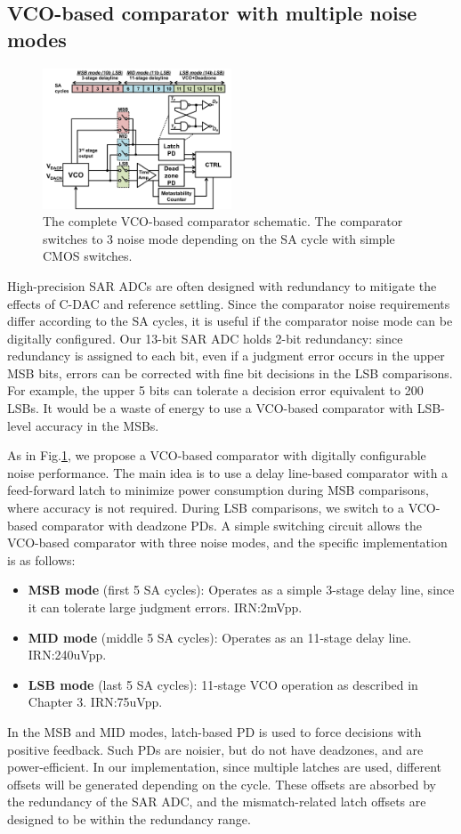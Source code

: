 \documentclass[journal]{IEEEtran}
\begin{document}
\subsection{VCO-based comparator with multiple noise modes}
\begin{figure}[!]
\centering
\includegraphics[width=0.5\textwidth]{figs/vco-entire.png}
\caption{The complete VCO-based comparator schematic. The comparator switches to 3 noise mode depending on the SA cycle with simple CMOS switches.}
\label{fullvco}
\end{figure}

High-precision SAR ADCs are often designed with redundancy to mitigate the effects of C-DAC and reference settling. Since the comparator noise requirements differ according to the SA cycles, it is useful if the comparator noise mode can be digitally configured.
Our 13-bit SAR ADC holds 2-bit redundancy: since redundancy is assigned to each bit, even if a judgment error occurs in the upper MSB bits, errors can be corrected with fine bit decisions in the LSB comparisons\cite{kapusta201314b}. For example, the upper 5 bits can tolerate a decision error equivalent to 200 LSBs. It would be a waste of energy to use a VCO-based comparator with LSB-level accuracy in the MSBs.

As in Fig.\ref{fullvco}, we propose a VCO-based comparator with digitally configurable noise performance. 
The main idea is to use a delay line-based comparator with a feed-forward latch to minimize power consumption during MSB comparisons, where accuracy is not required. During LSB comparisons, we switch to a VCO-based comparator with deadzone PDs. A simple switching circuit allows the VCO-based comparator with three noise modes, and the specific implementation is as follows:
\begin{itemize}
\item \textbf{MSB mode} (first 5 SA cycles): Operates as a simple 3-stage delay line, since it can tolerate large judgment errors. IRN:2mVpp.
\item \textbf{MID mode} (middle 5 SA cycles): Operates as an 11-stage delay line. IRN:240uVpp.
\item \textbf{LSB mode} (last 5 SA cycles): 11-stage VCO operation as described in Chapter 3. IRN:75uVpp.
\end{itemize}
In the MSB and MID modes, latch-based PD is used to force decisions with positive feedback. Such PDs are noisier, but do not have deadzones, and are power-efficient.
In our implementation, since multiple latches are used, different offsets will be generated depending on the cycle. These offsets are absorbed by the redundancy of the SAR ADC, and the mismatch-related latch offsets are designed to be within the redundancy range.
\end{document}
